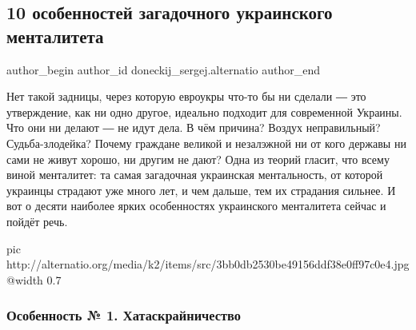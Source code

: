  
 
 
 
 
\subsection{10 особенностей загадочного украинского менталитета}

\ifcmt
 author_begin
   author_id doneckij_sergej.alternatio
 author_end
\fi

Нет такой задницы, через которую евроукры что-то бы ни сделали ― это
утверждение, как ни одно другое, идеально подходит для современной Украины. Что
они ни делают ― не идут дела. В чём причина? Воздух неправильный?
Судьба-злодейка? Почему граждане великой и незалэжной ни от кого державы ни
сами не живут хорошо, ни другим не дают? Одна из теорий гласит, что всему виной
менталитет: та самая загадочная украинская ментальность, от которой украинцы
страдают уже много лет, и чем дальше, тем их страдания сильнее. И вот о десяти
наиболее ярких особенностях украинского менталитета сейчас и пойдёт речь.

\ifcmt
  pic http://alternatio.org/media/k2/items/src/3bb0db2530be49156ddf38e0ff97c0e4.jpg
  @width 0.7
\fi

\subsubsection{Особенность № 1. Хатаскрайничество}

